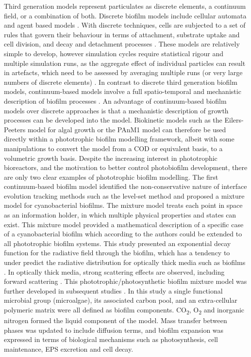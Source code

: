 Third generation models represent particulates as discrete elements, a continuum field, or a combination of both. Discrete biofilm models include cellular automata and agent based models \cite{skoneczny2015}. 
With discrete techniques, cells are subjected to a set of rules that govern their behaviour in terms of attachment, substrate uptake and cell division, and decay and detachment processes \cite{skoneczny2015}. 
These models are relatively simple to develop, however simulation cycles require statistical rigour and multiple simulation runs, as the aggregate effect of individual particles can result in artefacts, which need to be assessed by averaging multiple runs (or very large numbers of discrete elements) \cite{dacunto2017}. 
In contrast to discrete third generation biofilm models, continuum-based models involve a full spatio-temporal and mechanistic description of biofilm processes \cite{eberl2001}. 
An advantage of continuum-based biofilm models over discrete approaches is that a mechanistic description of growth processes can be developed into the model.
Biokinetic models such as the Eilers-Peeters model for algal growth \cite{eilers1988} or the PAnM1 model \cite{puyol2017} can therefore be used directly within a phototrophic biofilm modelling framework, albeit with some manipulations to convert the model from a COD or equivalent basis, to a volumetric growth basis. 
\skippingparagraph
Despite the increasing interest in phototrophic bioreactors, and the motivation to better control photobiofilm development, there are only two clear examples of phototrophic biofilm modelling. 
The first continuum-based biofilm model \cite{clarelli2013} identified the non-conservative nature of interface evolution tracking methods such as the level-set method \cite{alpkvist2007} and proposed a mixture model for cyanobacterial biofilms. 
The mixture model treats each point in space as an information holder, in which multiple physical properties and states can exist. 
This mixture model provided a mathematical description of a specific case of a cyanobacterial biofilm which according to the authors could be extended to all phototrophic biofilm systems. 
This study presented an exponential decay function for the radiative field through the biofilm, which has a tendency to under predict the radiative distribution for optically thick media such as biofilms \cite{jarosz2008}. 
In optically thick media, strong scattering effects are observed, including forward scattering \cite{jarosz2008}. 
This phototrophic/photosynthetic biofilm mixture model was further developed in subsequent studies \cite{polizzi2017}. In this study a single functional microbial group (microalgae), its associated carbon pool, and an extra-cellular polymeric matrix were all defined as biofilm components. CO\textsubscript{2}, O\textsubscript{2} and inorganic nitrogen formed the liquid component of the model. Mass transfer between phases was updated to include diffusion terms, and biofilm expansion was expressed in terms of biological mechanisms such as photosynthesis, cell maintenance, EPS excretion and cell decay. 
